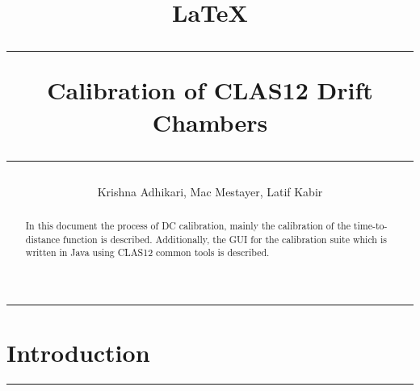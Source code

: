 \documentclass[12pt]{article}
\title{\LaTeX}
\date{}
\begin{document}
\title{
{\color{black} \rule{\linewidth}{0.75mm} }
Calibration of CLAS12 Drift Chambers
{\color{black} \rule{\linewidth}{0.75mm} }
\vspace{-1.5
cm}
}
\author{Krishna Adhikari, Mac Mestayer, Latif Kabir}

\maketitle

\begin{abstract}
In this document the process of DC calibration, mainly the calibration of the time-to-distance function is described. Additionally, the GUI for the calibration suite which is written in Java using CLAS12 common tools is described.
\end{abstract}

\tableofcontents

\pagebreak


{\color{black} \rule{\linewidth}{0.75mm} }
\section{Introduction}
{\color{black} \rule{\linewidth}{0.75mm} }
\end{document}
